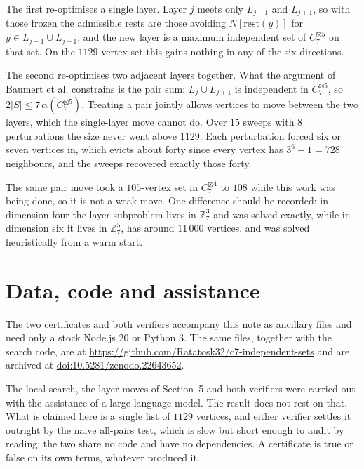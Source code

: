 \documentclass[11pt,a4paper]{article}
\newcommand{\bt}{\boxtimes}
\newcommand{\al}{\alpha}
\begin{document}
The first re-optimises a single layer. Layer $j$ meets only $L_{j-1}$ and $L_{j+1}$, so with
those frozen the admissible rests are those avoiding $N[\mathrm{rest}(y)]$ for
$y \in L_{j-1} \cup L_{j+1}$, and the new layer is a maximum independent set of $C_7^{\bt 5}$
on that set. On the $1129$-vertex set this gains nothing in any of the six directions.

The second re-optimises two adjacent layers together. What the argument of Baumert et al.
\cite{Baumert} constrains is the pair sum: $L_j \cup L_{j+1}$ is independent in $C_7^{\bt 5}$,
so $2|S| \le 7\,\al(C_7^{\bt 5})$. Treating a pair jointly allows vertices to move between the
two layers, which the single-layer move cannot do. Over $15$ sweeps with $8$ perturbations the
size never went above $1129$. Each perturbation forced six or seven vertices in, which evicts
about forty since every vertex has $3^6 - 1 = 728$ neighbours, and the sweeps recovered
exactly those forty.

The same pair move took a $105$-vertex set in $C_7^{\bt 4}$ to $108$ while this work was being
done, so it is not a weak move. One difference should be recorded: in dimension four the layer
subproblem lives in $\mathbb{Z}_7^3$ and was solved exactly, while in dimension six it lives in
$\mathbb{Z}_7^5$, has around $11\,000$ vertices, and was solved heuristically from a warm start.

\section*{Data, code and assistance}

The two certificates and both verifiers accompany this note as ancillary files and need only
a stock Node.js 20 or Python 3. The same files, together with the search code, are at
\url{https://github.com/Ratatosk32/c7-independent-sets} and are archived at
\href{https://doi.org/10.5281/zenodo.22643652}{doi:10.5281/zenodo.22643652}.

The local search, the layer moves of Section~5 and both verifiers were carried out with the
assistance of a large language model. The result does not rest on that. What is claimed here is
a single list of $1129$ vertices, and either verifier settles it outright by the naive all-pairs
test, which is slow but short enough to audit by reading; the two share no code and have no
dependencies. A certificate is true or false on its own terms, whatever produced it.
\end{document}

